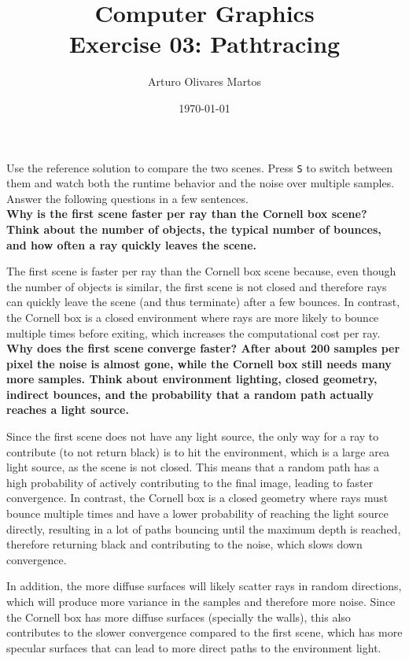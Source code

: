 \documentclass[12pt]{article}
\title{Computer Graphics\\Exercise 03: Pathtracing}
\author{Arturo Olivares Martos}
\date{\today}
\begin{document}
\maketitle

Use the reference solution to compare the two scenes. Press \texttt{S} to switch between them and watch both the runtime behavior and the noise over multiple samples. Answer the following questions in a few sentences.\\

\textbf{Why is the first scene faster per ray than the Cornell box scene? Think about the number of objects, the typical number of bounces, and how often a ray quickly leaves the scene.}

The first scene is faster per ray than the Cornell box scene because, even though the number of objects is similar, the first scene is not closed and therefore rays can quickly leave the scene (and thus terminate) after a few bounces. In contrast, the Cornell box is a closed environment where rays are more likely to bounce multiple times before exiting, which increases the computational cost per ray.\\

\textbf{Why does the first scene converge faster? After about 200 samples per pixel the noise is almost gone, while the Cornell box still needs many more samples. Think about environment lighting, closed geometry, indirect bounces, and the probability that a random path actually reaches a light source.}

Since the first scene does not have any light source, the only way for a ray to contribute (to not return black) is to hit the environment, which is a large area light source, as the scene is not closed. This means that a random path has a high probability of actively contributing to the final image, leading to faster convergence. In contrast, the Cornell box is a closed geometry where rays must bounce multiple times and have a lower probability of reaching the light source directly, resulting in a lot of paths bouncing until the maximum depth is reached, therefore returning black and contributing to the noise, which slows down convergence.

In addition, the more diffuse surfaces will likely scatter rays in random directions, which will produce more variance in the samples and therefore more noise. Since the Cornell box has more diffuse surfaces (specially the walls), this also contributes to the slower convergence compared to the first scene, which has more specular surfaces that can lead to more direct paths to the environment light.
\end{document}
